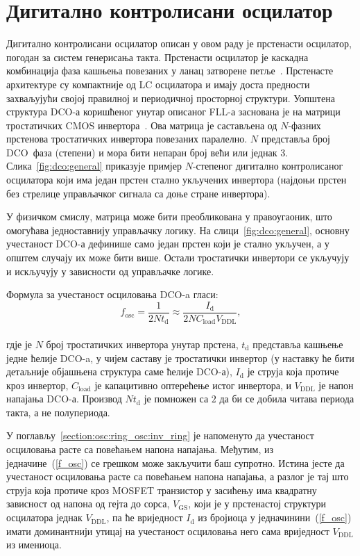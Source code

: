 \documentclass[master]{finthesis}
\def \FLL  {FLL} %
\def \DCO  {DCO} %
\begin{document}
\section{Дигитално контролисани осцилатор} \label{DCO chapter}
Дигитално контролисани осцилатор описан у овом раду је прстенасти осцилатор, погодан за систем генерисања такта. Прстенасти осцилатор је каскадна комбинација фаза кашњења повезаних у ланац затворене петље~\cite{Madhusudhana:283751064}. Прстенасте архитектуре су компактније од LC осцилатора и имају доста предности захваљујући својој правилној и периодичној просторној структури. Уопштена структура \DCO-а коришћеног унутар описаног \FLL-а заснована је на матрици тростатичких CMOS инвертора~\cite{Terosiet:340277809}. Ова матрица је састављена од $N$-фазних прстенова тростатичких инвертора повезаних паралелно. $N$ представља број \DCO\ фаза (степени) и мора бити непаран број већи или једнак 3. Слика~\ref{fig:dco:general} приказује примјер $N$-степеног дигитално контролисаног осцилатора који има један прстен стално укључених инвертора (најдоњи прстен без стрелице управљачког сигнала са доње стране инвертора). \par

У физичком смислу, матрица може бити преобликована у правоугаоник, што омогућава једноставнију управљачку логику. На слици~\ref{fig:dco:general}, основну учестаност \DCO-а дефинише само један прстен који је стално укључен, а у општем случају их може бити више. Остали тростатички инвертори се укључују и искључују у зависности од управљачке логике. \par
Формула за учестаност осциловања \DCO-a гласи:
\begin{equation} \label{f_osc}
    f_\text{osc} = \dfrac{1}{2Nt_\text{d}} \approx \dfrac{I_\text{d}}{2NC_\text{load}V_\text{DDL}},
\end{equation} \\
гдје је $N$ број тростатичких инвертора унутар прстена, $t_\text{d}$ представља кашњење једне ћелије \DCO-a, у чијем саставу је тростатички инвертор (у наставку ће бити детаљније објашњена структура саме ћелије \DCO-а), $I_\text{d}$ је струја која протиче кроз инвертор, $C_\text{load}$ је капацитивно оптерећење истог инвертора, и $V_\text{DDL}$ је напон напајања \DCO-а. Производ $Nt_\text{d}$ је помножен са $2$ да би се добила читава периода такта, а не полупериода. \par
У поглављу~\ref{section:osc:ring_osc:inv_ring} је напоменуто да учестаност осциловања расте са повећањем напона напајања. Међутим, из једначине~(\ref{f_osc}) се грешком може закључити баш супротно. Истина јесте да учестаност осциловања расте са повећањем напона напајања, а разлог је тај што струја која протиче кроз MOSFET транзистор у засићењу има квадратну зависност од напона од гејта до сорса, $V_\text{GS}$, који је у прстенастој структури осцилатора једнак $V_\text{DDL}$, па ће вриједност $I_\text{d}$ из бројиоца у једначинини~(\ref{f_osc}) имати доминантнији утицај на учестаност осциловања него сама вриједност $V_\text{DDL}$ из имениоца. \par
\end{document}
